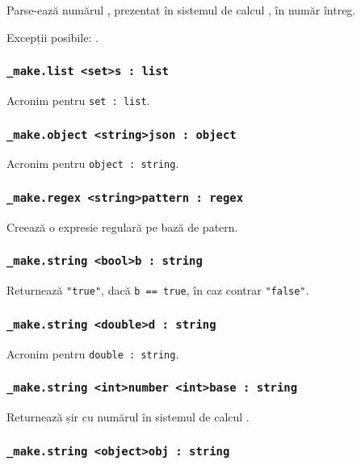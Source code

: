 Parse-ează numărul , prezentat în sistemul de calcul , în număr întreg.

Excepții posibile: .

\subsubsection{\lstinline|_make.list <set>s : list|}

Acronim pentru \lstinline|set : list|.

\subsubsection{\lstinline|_make.object <string>json : object|}

Acronim pentru \lstinline|object : string|.

\subsubsection{\lstinline|_make.regex <string>pattern : regex|}

Creează o expresie regulară pe bază de patern.

\subsubsection{\lstinline|_make.string <bool>b : string|}

Returnează \lstinline|"true"|, dacă \lstinline|b == true|, în caz contrar \lstinline|"false"|.

\subsubsection{\lstinline|_make.string <double>d : string|}

Acronim pentru \lstinline|double : string|.

\subsubsection{\lstinline|_make.string <int>number <int>base : string|}

Returnează șir cu numărul  în sistemul de calcul .

\subsubsection{\lstinline|_make.string <object>obj : string|}

